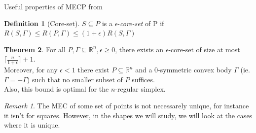 \documentclass{article}
\theoremstyle{definition}
\newtheorem{theo}{Theorem}[section]
\newtheorem{defi}[theo]{Definition}
\theoremstyle{remark}
\newtheorem*{rk}{Remark}
\begin{document}
\begin{subsection}{Useful properties of MECP from \cite{BK13,BR09}}
  \begin{defi}[Core-set]
    $S \subseteq P$ is a $\epsilon$-\emph{core-set} of P if $R(S,\Gamma) \leq R(P,\Gamma) \leq (1+\epsilon)R(S,\Gamma)$\\
  \end{defi}

  \begin{theo}
    For all $P,\Gamma \subseteq \mathbb{R}^n, \epsilon \geq 0$, there exists an $\epsilon$-core-set of size at most $\lceil\frac{n}{1+\epsilon}\rceil+1$.\\
    Moreover, for any $\epsilon < 1$ there exist $P \subseteq \mathbb{R}^n$ and a $0$-symmetric convex body $\Gamma$ (ie. $\Gamma = -\Gamma$) such that no smaller subset of $P$ suffices.\\
    Also, this bound is optimal for the $n$-regular simplex.
  \end{theo}

  \begin{rk}
    The MEC of some set of points is not necessarely unique, for instance it isn't for squares. However, in the shapes we will study, we will look at the cases where it is unique.
  \end{rk}
\end{subsection}
\end{document}
